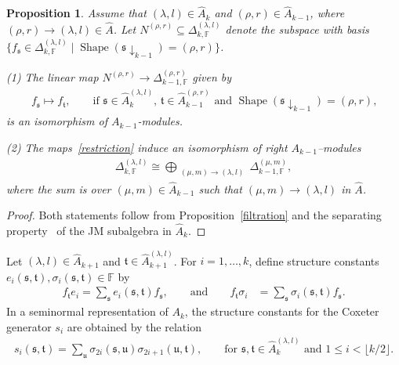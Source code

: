\documentclass[11pt,a4paper,reqno,svgnames]{amsart}
\theoremstyle{plain}
\newtheorem{proposition}[theorem]{Proposition}
\theoremstyle{definition}
\numberwithin{equation}{section}
\begin{document}
\begin{proposition}
Assume that $(\lambda,l)\in\hat{A}_k$ and  $(\rho,r)\in\hat{A}_{k-1}$, where $(\rho,r)\to(\lambda,l)\in\hat{A}$. Let $N^{(\rho,r)}\subseteq \Delta_{k,\mathbb{F}}^{(\lambda,l)}$ denote the subspace with basis $\lbrace f_\mathfrak{s} \in \Delta_{k,\mathbb{F}}^{(\lambda,l)} \mid \operatorname{Shape}(\mathfrak{s}\downarrow_{k-1})=(\rho,r)\rbrace$.
\item[(1)]  The linear map $N^{(\rho,r)}\to \Delta_{k-1,\mathbb{F}}^{(\rho,r)}$ given by
\begin{align}\label{restriction}
f_\mathfrak{s}\mapsto f_\mathfrak{t},\qquad\text{if  $\mathfrak{s}\in\hat{A}_k^{(\lambda,l)}$, $\mathfrak{t}\in\hat{A}_{k-1}^{(\rho,r)}$ and $\operatorname{Shape}(\mathfrak{s}\downarrow_{k-1})=(\rho,r)$,}
\end{align} 
is an isomorphism of $A_{k-1}$-modules. 
\item[(2)] The maps~\eqref{restriction} induce an isomorphism of right $A_{k-1}$--modules
\begin{align*}
\Delta^{(\lambda,l)}_{k,\mathbb{F} }\cong\bigoplus_{ \substack{(\mu,m) \to(\lambda,l)}}\Delta^{(\mu,m)}_{k-1,\mathbb{F}},
\end{align*}
where the sum is over $(\mu,m)\in\hat{A}_{k-1}$ such that $(\mu,m)\to(\lambda,l)$ in $\hat{A}$. 
\end{proposition}
\begin{proof}
Both statements follow from Proposition~\ref{filtration} and the separating property~\cite[Definition~2.8]{MR2414949} of the JM subalgebra in $\hat{A}_k$. 
\end{proof}
Let $(\lambda,{l})\in\hat{A}_{k+1}$ and  $\mathfrak{t}\in\hat{A}_{k+1}^{(\lambda,{l})}$. For $i=1,\ldots,k$, define structure constants $e_i(\mathfrak{s},\mathfrak{t}),\sigma_{i}(\mathfrak{s},\mathfrak{t})\in\mathbb{F}$ by
\begin{align*}
f_\mathfrak{t}e_{i}
=\sum_{\mathfrak{s}} e_{i}(\mathfrak{s},\mathfrak{t})f_\mathfrak{s},\qquad\text{and}\qquad f_\mathfrak{t}\sigma_{i}
&=\sum_{\mathfrak{s}} \sigma_{i}(\mathfrak{s},\mathfrak{t})f_\mathfrak{s}.
\end{align*}
In a seminormal representation of $A_{k}$, the structure constants for the Coxeter generator $s_i$  are obtained by the relation
\begin{align*}
s_i(\mathfrak{s},\mathfrak{t})= \sum_{\mathfrak{u}}
\sigma_{2i}(\mathfrak{s},\mathfrak{u})\sigma_{2i+1}(\mathfrak{u},\mathfrak{t}),\qquad\text{for $\mathfrak{s},\mathfrak{t}\in\hat{A}_{k}^{(\lambda,{l})}$ and $1{\leqslant} i<\lfloor k/2\rfloor$.}
\end{align*}
\end{document}
